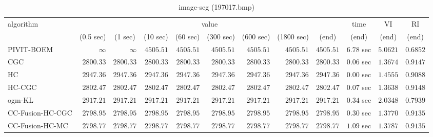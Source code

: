 \begin{table}[H]
\scriptsize
\centering
\caption{image-seg (197017.bmp)}
\label{tab:anytimetable-image-seg-197017.bmp}
\begin{tabular}{lrrrrrrrrrrr}
\toprule
           algorithm &                                   \multicolumn{8}{c}{value} & \multicolumn{1}{c}{time}    & \multicolumn{1}{c}{VI}  & \multicolumn{1}{c}{RI} \\  
\cmidrule(lr){2-9}\cmidrule(lr){10-10} \cmidrule(lr){11-11} \cmidrule(lr){12-12}   
                     & \multicolumn{1}{c}{(0.5 sec)} & \multicolumn{1}{c}{(1 sec)} & \multicolumn{1}{c}{(10 sec)} & \multicolumn{1}{c}{(60 sec)} & \multicolumn{1}{c}{(300 sec)} & \multicolumn{1}{c}{(600 sec)} & \multicolumn{1}{c}{(1800 sec)} & \multicolumn{1}{c}{(end)} & \multicolumn{1}{c}{(end)}    & \multicolumn{1}{c}{(end)}   & \multicolumn{1}{c}{(end)}  \\ \midrule 
          PIVIT-BOEM & $\infty$ & $\infty$ & $      4505.51$ & $      4505.51$ & $      4505.51$ & $      4505.51$ & $      4505.51$ & $      4505.51$ & $         6.78$ sec    & $       5.0621$  & $       0.6852$ \\ 
                 CGC & $      2800.33$ & $      2800.33$ & $      2800.33$ & $      2800.33$ & $      2800.33$ & $      2800.33$ & $      2800.33$ & $      2800.33$ & $         0.06$ sec    & $       1.3674$  & $       0.9147$ \\ 
                  HC & $      2947.36$ & $      2947.36$ & $      2947.36$ & $      2947.36$ & $      2947.36$ & $      2947.36$ & $      2947.36$ & $      2947.36$ & $         0.00$ sec    & $       1.4555$  & $       0.9088$ \\ 
              HC-CGC & $      2802.47$ & $      2802.47$ & $      2802.47$ & $      2802.47$ & $      2802.47$ & $      2802.47$ & $      2802.47$ & $      2802.47$ & $         0.07$ sec    & $       1.3638$  & $       0.9148$ \\ 
              ogm-KL & $      2917.21$ & $      2917.21$ & $      2917.21$ & $      2917.21$ & $      2917.21$ & $      2917.21$ & $      2917.21$ & $      2917.21$ & $         0.34$ sec    & $       2.0348$  & $       0.7939$ \\ 
    CC-Fusion-HC-CGC & $      2798.95$ & $      2798.95$ & $      2798.95$ & $      2798.95$ & $      2798.95$ & $      2798.95$ & $      2798.95$ & $      2798.95$ & $         0.30$ sec    & $       1.3770$  & $       0.9135$ \\ 
     CC-Fusion-HC-MC & $      2798.77$ & $      2798.77$ & $      2798.77$ & $      2798.77$ & $      2798.77$ & $      2798.77$ & $      2798.77$ & $      2798.77$ & $         1.09$ sec    & $       1.3787$  & $       0.9135$ \\ 

\end{tabular}
\end{table}
